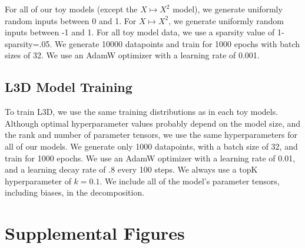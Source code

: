 \documentclass{article}
\theoremstyle{plain}
\theoremstyle{definition}
\theoremstyle{remark}
\begin{document}
For all of our toy models (except the $X \mapsto X^2$ model), we generate uniformly random inputs between 0 and 1. For $X \mapsto X^2$, we generate uniformly random inputs between -1 and 1. For all toy model data, we use a sparsity value of 1-sparsity=.05. We generate 10000 datapoints and train for 1000 epochs with batch sizes of 32. We use an AdamW optimizer with a learning rate of 0.001. 

\subsection{L3D Model Training}\label{sec:L3D_hyperparams}

To train L3D, we use the same training distributions as in each toy models. Although optimal hyperparameter values probably depend on the model size, and the rank and number of parameter tensors, we use the same hyperparameters for all of our models. We generate only 1000 datapoints, with a batch size of 32, and train for 1000 epochs. We use an AdamW optimizer with a learning rate of 0.01, and a learning decay rate of .8 every 100 steps. We always use a $\text{topK}$ hyperparameter of $k=0.1$.  We include all of the model's parameter tensors, including biases, in the decomposition. 

\section{Supplemental Figures}
\end{document}
